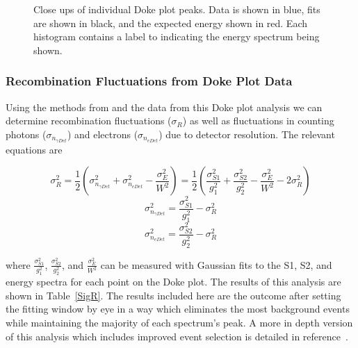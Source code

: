 \begin{figure}
\qquad
{}
\caption{ Close ups of individual Doke plot peaks.  Data is shown in blue, fits are shown in black, and the expected energy shown in red.  Each histogram contains a label to indicating the energy spectrum being shown.}
\label{fig:DokeCloseUps}
\end{figure}


\subsubsection{Recombination Fluctuations from Doke Plot Data}

Using the methods from \cite{Dobi} and the data from this Doke plot analysis we can determine recombination fluctuations ($\sigma_{R}$) as well as fluctuations in counting photons ($\sigma_{n_{\gamma Det}}$) and electrons ($\sigma_{n_{e Det}}$) due to detector resolution.  The relevant equations are

\[\sigma_{R}^2 = \frac{1}{2}( \sigma_{n_{\gamma Det}}^2 + \sigma_{n_{e Det}}^2 - \frac{\sigma_{E}^2}{W^2}) = \frac{1}{2}(\frac{\sigma_{S1}^2}{g_{1}^2} + \frac{\sigma_{S2}^2}{g_{2}^2} - \frac{\sigma_{E}^2}{W^2} -2\sigma_{R}^2) \]
\[ \sigma_{n_{\gamma Det}}^2 = \frac{\sigma_{S1}^2}{g_{1}^2} - \sigma_{R}^2 \]
\[ \sigma_{n_{e Det}}^2 = \frac{\sigma_{S2}^2}{g_{2}^2} - \sigma_{R}^2 \]


where $\frac{\sigma_{S1}^2}{g_{1}^2}$, $\frac{\sigma_{S2}^2}{g_{2}^2}$, and $\frac{\sigma_{E}^2}{W^2}$ can be measured with Gaussian fits to the S1, S2, and energy spectra for each point on the Doke plot.  The results of this analysis are shown in Table~\ref{SigR}.  The results included here are the outcome after setting the fitting window by eye in a way which eliminates the most background events while maintaining the majority of each spectrum's peak.  A more in depth version of this analysis which includes improved event selection is detailed in reference~\cite{akerib2016signal}.

